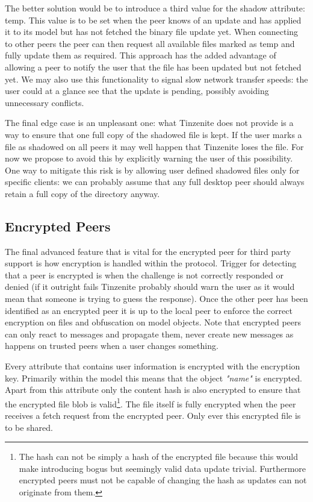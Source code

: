 The better solution would be to introduce a third value for the shadow attribute: temp.
This value is to be set when the peer knows of an update and has applied it to its model but has not fetched the binary file update yet.
When connecting to other peers the peer can then request all available files marked as temp and fully update them as required.
This approach has the added advantage of allowing a peer to notify the user that the file has been updated but not fetched yet.
We may also use this functionality to signal slow network transfer speeds: the user could at a glance see that the update is pending, possibly avoiding unnecessary conflicts.

The final edge case is an unpleasant one: what Tinzenite does not provide is a way to ensure that one full copy of the shadowed file is kept.
If the user marks a file as shadowed on all peers it may well happen that Tinzenite loses the file.
For now we propose to avoid this by explicitly warning the user of this possibility.
One way to mitigate this risk is by allowing user defined shadowed files only for specific clients: we can probably assume that any full desktop peer should always retain a full copy of the directory anyway.


\subsection{Encrypted Peers}
\label{sub:Encrypted Peers}

The final advanced feature that is vital for the encrypted peer for third party support is how encryption is handled within the protocol.
Trigger for detecting that a peer is encrypted is when the challenge is not correctly responded or denied (if it outright fails Tinzenite probably should warn the user as it would mean that someone is trying to guess the response).
Once the other peer has been identified as an encrypted peer it is up to the local peer to enforce the correct encryption on files and obfuscation on model objects.
Note that encrypted peers can only react to messages and propagate them, never create new messages as happens on trusted peers when a user changes something.

Every attribute that contains user information is encrypted with the encryption key.
Primarily within the model this means that the object \textit{"name"} is encrypted.
Apart from this attribute only the content hash is also encrypted to ensure that the encrypted file blob is valid\footnote{The hash can not be simply a hash of the encrypted file because this would make introducing bogus but seemingly valid data update trivial. Furthermore encrypted peers must not be capable of changing the hash as updates can not originate from them.}.
The file itself is fully encrypted when the peer receives a fetch request from the encrypted peer.
Only ever this encrypted file is to be shared.

